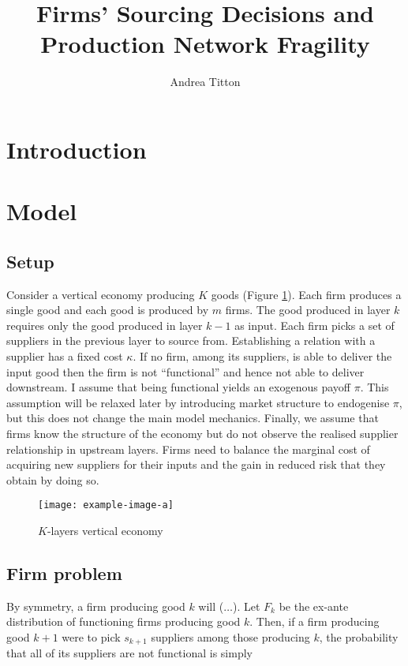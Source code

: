 \documentclass[american, abstract=on]{scrartcl}
\author{Andrea Titton}
\title{Firms' Sourcing Decisions and\\ Production Network Fragility}
\newcommand{\inputTikZ}[2]{%
        \scalebox{#1}{}  
      }
\theoremstyle{plain}
\begin{document}
\maketitle
\section{Introduction}

\section{Model}

\subsection{Setup}

Consider a vertical economy producing $K$ goods (Figure \ref{fig:vertical-economy-diagram}). Each firm produces a single good and each good is produced by $m$ firms. The good produced in layer $k$ requires only the good produced in layer $k - 1$ as input. Each firm picks a set of suppliers in the previous layer to source from. Establishing a relation with a supplier has a fixed cost $\kappa$. If no firm, among its suppliers, is able to deliver the input good then the firm is not ``functional'' and hence not able to deliver downstream. I assume that being functional yields an exogenous payoff $\pi$. This assumption will be relaxed later by introducing market structure to endogenise $\pi$, but this does not change the main model mechanics. Finally, we assume that firms know the structure of the economy but do not observe the realised supplier relationship in upstream layers. Firms need to balance the marginal cost of acquiring new suppliers for their inputs and the gain in reduced risk that they obtain by doing so.

\begin{figure}[H]
  \centering
  \texttt{[image: example-image-a]}
  \caption{$K$-layers vertical economy}
  \label{fig:vertical-economy-diagram}
\end{figure}

\subsection{Firm problem}

By symmetry, a firm producing good $k$ will ($\ldots$). Let $F_k$ be the ex-ante distribution of functioning firms producing good $k$. Then, if a firm producing good $k + 1$ were to pick $s_{k + 1}$ suppliers among those producing $k$, the probability that all of its suppliers are not functional is simply
\end{document}
